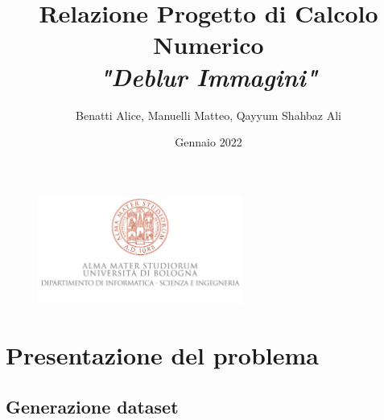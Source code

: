 \documentclass{article}
\title{\textbf{Relazione Progetto di Calcolo Numerico} \\ \textit{"Deblur Immagini"}}
\author{Benatti Alice, Manuelli Matteo, Qayyum Shahbaz Ali}
\date{Gennaio 2022}
\begin{document}
\maketitle
\begin{figure}[b]
    \centering
    \includegraphics[width=0.6\textwidth]{imgRel/alma-logo.jpg}
\end{figure}
\newpage

\tableofcontents
\newpage

\section{Presentazione del problema}

    \subsection{Generazione dataset}
    
    
    

    
    
    

    
    
    \newpage


\end{document}
